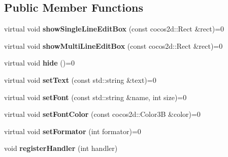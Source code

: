 \subsection*{Public Member Functions}
\begin{DoxyCompactItemize}
\item 
\mbox{\label{classPlayerEditBoxServiceProtocol_af2c2dd71c5f64239bcc4dfb428bd5653}} 
virtual void {\bfseries show\+Single\+Line\+Edit\+Box} (const cocos2d\+::\+Rect \&rect)=0
\item 
\mbox{\label{classPlayerEditBoxServiceProtocol_aa70c101ecd43cab1d9c94a01a735a1ba}} 
virtual void {\bfseries show\+Multi\+Line\+Edit\+Box} (const cocos2d\+::\+Rect \&rect)=0
\item 
\mbox{\label{classPlayerEditBoxServiceProtocol_ad8fdc1f38f029c262446126a14d3ebb6}} 
virtual void {\bfseries hide} ()=0
\item 
\mbox{\label{classPlayerEditBoxServiceProtocol_aa3470ad3d165a33ce4eb49fa9204ce73}} 
virtual void {\bfseries set\+Text} (const std\+::string \&text)=0
\item 
\mbox{\label{classPlayerEditBoxServiceProtocol_a0749718d22ad6fa4f11f3885b5198b86}} 
virtual void {\bfseries set\+Font} (const std\+::string \&name, int size)=0
\item 
\mbox{\label{classPlayerEditBoxServiceProtocol_ac5a4d55c93ca0447cec7174e978b8d18}} 
virtual void {\bfseries set\+Font\+Color} (const cocos2d\+::\+Color3B \&color)=0
\item 
\mbox{\label{classPlayerEditBoxServiceProtocol_adceae800a3ef4b73a8a39f6d69025f0e}} 
virtual void {\bfseries set\+Formator} (int formator)=0
\item 
\mbox{\label{classPlayerEditBoxServiceProtocol_a20402c5275385ffb9896050db950ba53}} 
void {\bfseries register\+Handler} (int handler)
\item 
\mbox{\label{classPlayerEditBoxServiceProtocol_ac861d74d983a5eb981c39b5bf35355e6}} 

\end{DoxyCompactItemize}
